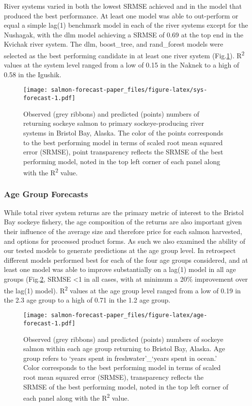 \documentclass[
]{article}
\begin{document}
River systems varied in both the lowest SRMSE achieved and in the model that produced the best performance. At least one model was able to out-perform or equal a simple lag(1) benchmark model in each of the river systems except for the Nushagak, with the dlm model achieving a SRMSE of 0.69 at the top end in the Kvichak river system. The dlm, boost\_tree, and rand\_forest models were selected as the best performing candidate in at least one river system (Fig.\ref{fig:sys-forecast}). R\textsuperscript{2} values at the system level ranged from a low of 0.15 in the Naknek to a high of 0.58 in the Igushik.

\begin{figure}
\centering
\texttt{[image: salmon-forecast-paper\_files/figure-latex/sys-forecast-1.pdf]}
\caption{\label{fig:sys-forecast}Observed (grey ribbons) and predicted (points) numbers of returning sockeye salmon to primary sockeye-producing river systems in Bristol Bay, Alaska. The color of the points corresponds to the best performing model in terms of scaled root mean squared error (SRMSE), point transparency reflects the SRMSE of the best performing model, noted in the top left corner of each panel along with the R\textsuperscript{2} value.}
\end{figure}

\hypertarget{age-group-forecasts}{%
\subsubsection{Age Group Forecasts}\label{age-group-forecasts}}

While total river system returns are the primary metric of interest to the Bristol Bay sockeye fishery, the age composition of the returns are also important given their influence of the average size and therefore price for each salmon harvested, and options for processed product forms. As such we also examined the ability of our tested models to generate predictions at the age group level. In retrospect different models performed best for each of the four age groups considered, and at least one model was able to improve substantially on a lag(1) model in all age groups (Fig.\ref{fig:age-forecast}, SRMSE \textless1 in all cases, with at minimum a 20\% improvement over the lag(1) model). R\textsuperscript{2} values at the age group level ranged from a low of 0.19 in the 2.3 age group to a high of 0.71 in the 1.2 age group.

\begin{figure}
\centering
\texttt{[image: salmon-forecast-paper\_files/figure-latex/age-forecast-1.pdf]}
\caption{\label{fig:age-forecast}Observed (grey ribbons) and predicted (points) numbers of sockeye salmon within each age group returning to Bristol Bay, Alaska. Age group refers to `years spent in freshwater'\_`years spent in ocean.' Color corresponds to the best performing model in terms of scaled root mean squared error (SRMSE), transparency reflects the SRMSE of the best performing model, noted in the top left corner of each panel along with the R\textsuperscript{2} value.}
\end{figure}
\end{document}
